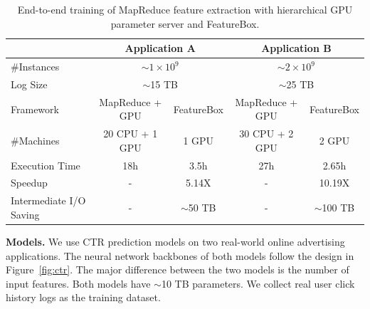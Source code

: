 \documentclass[conference]{IEEEtran}
\begin{document}
\begin{table}[htbp]
\caption{End-to-end training of MapReduce feature extraction with hierarchical GPU parameter server and FeatureBox.}\label{tbl:comp}
\normalsize
\centering
\begin{tabular}{l|c|c|c|c}
\toprule
\hline
 & \multicolumn{2}{c|}{Application A} & \multicolumn{2}{c}{Application B} \\
 \hline
\#Instances & \multicolumn{2}{c|}{$\sim 1\times10^9$} & \multicolumn{2}{c}{$\sim 2\times 10^9$} \\
Log Size & \multicolumn{2}{c|}{$\sim$15 TB} & \multicolumn{2}{c}{$\sim$25 TB} \\
\hline
Framework & MapReduce + GPU & \multicolumn{1}{l|}{FeatureBox} & MapReduce + GPU & \multicolumn{1}{l}{FeatureBox} \\
\hline
\#Machines & 20 CPU + 1 GPU & 1 GPU & 30 CPU + 2 GPU & 2 GPU \\
Execution Time & \multicolumn{1}{c|}{18h} & 3.5h & \multicolumn{1}{c|}{27h} & 2.65h \\
Speedup & \multicolumn{1}{c|}{-} & 5.14X & \multicolumn{1}{c|}{-} & 10.19X\\
Intermediate I/O Saving & - & $\sim$50 TB & - & $\sim$100 TB\\
\hline
\bottomrule
\end{tabular}
\end{table}

\textbf{Models.} 
We use CTR prediction models on two real-world online advertising applications. The neural network backbones of both models follow the design in Figure~\ref{fig:ctr}. The major difference between the two models is the number of input features. Both models have $\sim$10 TB parameters. We collect real user click history logs as the training dataset. 
\end{document}
